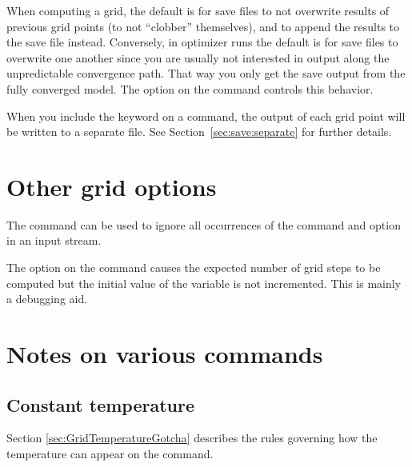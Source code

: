 When computing a grid, the default is for save files to not overwrite
results of previous grid points (to not ``clobber'' themselves), and
to append the results to the save file instead.
Conversely, in optimizer runs the default
is for save files to overwrite one another since you
are usually not interested in output along the unpredictable convergence path.
That way you only get the save output from the fully converged model.
The  option on the  command
controls this behavior.

When you include the  keyword on a 
command, the output of each grid point will be written to a separate file. See
Section~\ref{sec:save:separate} for further details.

\section{Other grid options}

The  command can be used to ignore all
occurrences of the  command and 
option in an input stream.

The  option on the  command
causes the expected number of grid
steps to be computed but the initial value of the variable is not
incremented.
This is mainly a debugging aid. 

\section{Notes on various commands}

\subsection{Constant temperature}
Section \ref{sec:GridTemperatureGotcha}
describes the rules governing how the temperature can
appear on the  command.
